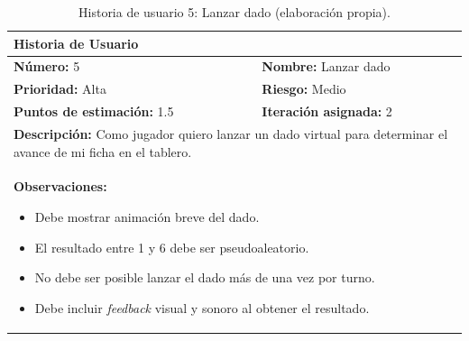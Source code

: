 \begin{table}[H]
\centering
\caption{Historia de usuario 5: Lanzar dado (elaboración propia).\label{tab:hu5}}
\renewcommand{\arraystretch}{1.5}
\begin{tabular}{|p{}|p{}|}
\hline
\multicolumn{2}{|l|}{\textbf{Historia de Usuario}} \\
\hline
\textbf{Número:} 5 & \textbf{Nombre:} Lanzar dado \\
\hline
\textbf{Prioridad:} Alta & \textbf{Riesgo:} Medio \\
\hline
\textbf{Puntos de estimación:} 1.5 & \textbf{Iteración asignada:} 2 \\
\hline
\multicolumn{2}{|p{0.945\textwidth}|}{\textbf{Descripción:} Como jugador quiero lanzar un dado virtual para determinar el avance de mi ficha en el tablero.} \\
\hline
\multicolumn{2}{|p{0.945\textwidth}|}{\textbf{Observaciones:}
\vspace{-0.5em}
\begin{itemize}
    \setlength\itemsep{0em}
    \item Debe mostrar animación breve del dado.
    \item El resultado entre 1 y 6 debe ser pseudoaleatorio.
    \item No debe ser posible lanzar el dado más de una vez por turno.
    \item Debe incluir \textit{feedback} visual y sonoro al obtener el resultado.
\end{itemize}
\vspace{-1em}
} \\
\hline
\end{tabular}
\end{table}

